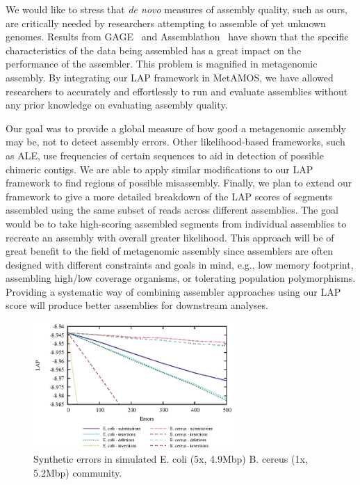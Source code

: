 \documentclass[conference]{IEEEtran}
\begin{document}

We would like to stress that \emph{de novo} measures of assembly quality, such as ours, are critically needed by researchers attempting to assemble of yet unknown genomes.
Results from GAGE~\cite{salzberg2011gage} and Assemblathon~\cite{earl2011assemblathon,bradnam2013assemblathon} have shown that the specific characteristics of the data being assembled has a great impact on the performance of the assembler.
This problem is magnified in metagenomic assembly.
By integrating our LAP framework in MetAMOS, we have allowed researchers to accurately and effortlessly to run and evaluate assemblies without any prior knowledge on evaluating assembly quality.

Our goal was to provide a global measure of how good a metagenomic assembly may be, not to detect assembly errors.
Other likelihood-based frameworks, such as ALE, use frequencies of certain sequences to aid in detection of possible chimeric contigs.
We are able to apply similar modifications to our LAP framework to find regions of possible misassembly.
Finally, we plan to extend our framework to give a more detailed breakdown of the LAP scores of segments assembled using the same subset of reads across different assemblies.
The goal would be to take high-scoring assembled segments from individual assemblies to recreate an assembly with overall greater likelihood.
This approach will be of great benefit to the field of metagenomic assembly since assemblers are often designed with different constraints and goals in mind, e.g., low memory footprint, assembling high/low coverage organisms, or tolerating population polymorphisms.
Providing a systematic way of combining assembler approaches using our LAP score will produce better assemblies for downstream analyses.


\begin{figure}[tb!]
\centering
\includegraphics[width=3in]{errors}
\caption{Synthetic errors in simulated E. coli (5x, 4.9Mbp) B. cereus (1x, 5.2Mbp) community.}
\label{fig:errors}
\end{figure}
\end{document}
